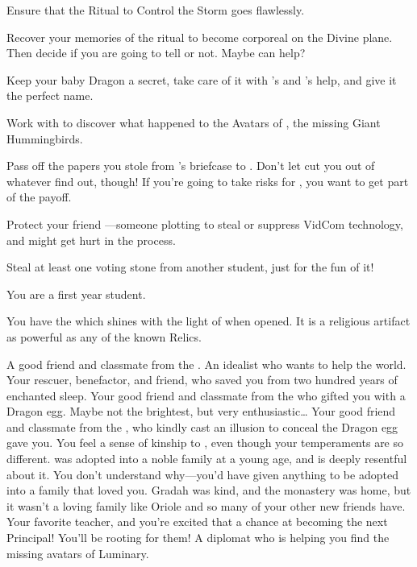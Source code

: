 \documentclass[char]{GL2020}
\begin{document}
\begin{itemz}
	\item Ensure that the Ritual to Control the Storm goes flawlessly.
	\item Recover your memories of the ritual to become corporeal on the Divine plane. Then decide if you are going to tell \cWildCard{} or not. Maybe \cTechStar{} can help?
	\item Keep your baby Dragon a secret, take care of it with \cPirateChild{}'s and \cAdopted{}'s help, and give it the perfect name.
	\item Work with \cJuniorStatesman{} to discover what happened to the Avatars of \cFarmGod{}, the missing Giant Hummingbirds.
	\item Pass off the papers you stole from \cBunker{}'s briefcase to \cWildCard{}. Don't let \cWildCard{\them} cut you out of whatever \cWildCard{\they} find\cWildCard{\plural} out, though! If you're going to take risks for \cWildCard{\them}, you want to get part of the payoff.
	\item Protect your friend \cTechStar{}---someone plotting to steal or suppress \cTechStar{\their} VidCom technology, and \cTechStar{} might get hurt in the process.
	\item Steal at least one voting stone from another student, just for the fun of it!
\end{itemz}

\begin{itemz}[Notes]
	\item You are a first year student.
	\item You have the \iLocket{} which shines with the light of \cFarmGod{} when opened. It is a religious artifact as powerful as any of the known Relics.
\end{itemz}

\begin{contacts}
		\contact{\cTechStar{}} A good friend and classmate from the \pTech{}. An idealist who wants to help the world.
	\contact{\cWildCard{}} Your rescuer, benefactor, and friend, who saved you from two hundred years of enchanted sleep.
	\contact{\cPirateChild{}} Your good friend and classmate from the \pShip{} who gifted you with a Dragon egg. Maybe not the brightest, but very enthusiastic…
	\contact{\cAdopted{}} Your good friend and classmate from the \pFarm{}, who kindly cast an illusion to conceal the Dragon egg \cPirateChild{} gave you. You feel a sense of kinship to \cAdopted{\them}, even though your temperaments are so different. \cAdopted{} was adopted into a noble family at a young age, and is deeply resentful about it. You don't understand why---you'd have given anything to be adopted into a family that loved you. Gradah was kind, and the monastery was home, but it wasn't a loving family like Oriole and so many of your other new friends have.
	\contact{\cMusic{}} Your favorite teacher, and you're excited that \cMusic{\they} \cMusic{\have} a chance at becoming the next Principal! You'll be rooting for them! 
	\contact{\cJuniorStatesman{}} A \pShip{} diplomat who is helping you find the missing avatars of Luminary.
\end{contacts}
\end{document}
